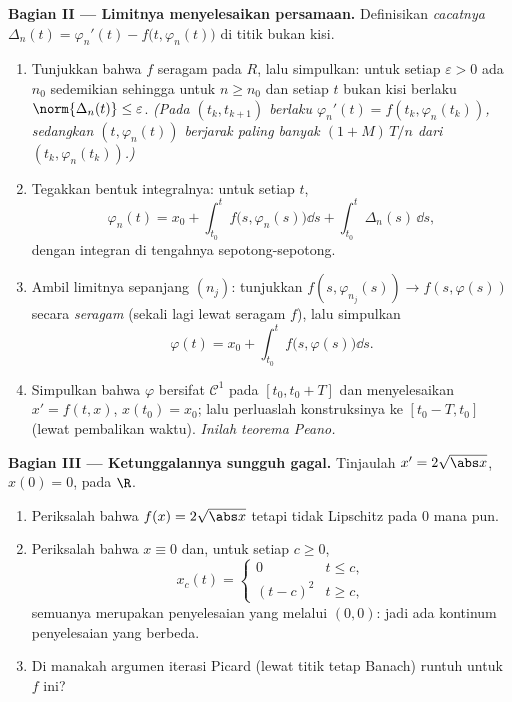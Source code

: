 \begin{problem}[{Soal akhir pekan --- keberadaan penyelesaian
$x' = f(t, x)$ tanpa Lipschitz}]
\medskip
\noindent\textbf{Bagian II --- Limitnya menyelesaikan persamaan.}
Definisikan \emph{cacatnya} $\Delta_n(t) = \varphi_n'(t) -
f\bigl(t, \varphi_n(t)\bigr)$ di titik bukan kisi.
\begin{enumerate}[resume]
  \item Tunjukkan bahwa $f$  seragam pada $R$, lalu
        simpulkan: untuk setiap $\varepsilon > 0$ ada $n_0$ sedemikian
        sehingga untuk $n \geq n_0$ dan setiap $t$ bukan kisi berlaku
        $\norm{\Delta_n(t)} \leq \varepsilon$. \emph{(Pada $(t_k,
        t_{k+1})$ berlaku $\varphi_n'(t) = f(t_k, \varphi_n(t_k))$,
        sedangkan $(t, \varphi_n(t))$ berjarak paling banyak
        $(1 + M)\,T/n$ dari $(t_k, \varphi_n(t_k))$.)}
  \item Tegakkan bentuk integralnya: untuk setiap $t$,
        \[
        \varphi_n(t) = x_0 + \int_{t_0}^{t}
        f\bigl(s, \varphi_n(s)\bigr)\dd s +
        \int_{t_0}^t \Delta_n(s)\,\dd s,
        \]
        dengan integran di tengahnya  sepotong-sepotong.
  \item Ambil limitnya sepanjang $(n_j)$: tunjukkan
        $f(s, \varphi_{n_j}(s)) \to f(s, \varphi(s))$
        secara \emph{seragam} (sekali lagi lewat  seragam $f$), lalu
        simpulkan
        \[
        \varphi(t) = x_0 + \int_{t_0}^t
        f\bigl(s, \varphi(s)\bigr)\dd s .
        \]
  \item Simpulkan bahwa $\varphi$ bersifat $\mathcal C^1$ pada $[t_0, t_0 +
        T]$ dan menyelesaikan $x' = f(t, x)$, $x(t_0) = x_0$; lalu perluaslah
        konstruksinya ke $[t_0 - T, t_0]$ (lewat pembalikan waktu).
        \emph{Inilah teorema Peano.}
\end{enumerate}

\medskip
\noindent\textbf{Bagian III --- Ketunggalannya sungguh gagal.}
Tinjaulah $x' = 2\sqrt{\abs x}$, $x(0) = 0$, pada $\R$.
\begin{enumerate}[resume]
  \item Periksalah bahwa $f(x) = 2\sqrt{\abs x}$  tetapi
        tidak Lipschitz pada  $0$ mana pun.
  \item Periksalah bahwa $x \equiv 0$ dan, untuk setiap $c \geq 0$,
        \[
        x_c(t) = \begin{cases} 0 & t \leq c,\\ (t - c)^2 & t
        \geq c,\end{cases}
        \]
        semuanya merupakan penyelesaian yang melalui $(0,0)$: jadi ada kontinum
        penyelesaian yang berbeda.
  \item Di manakah argumen iterasi Picard (lewat titik tetap
        Banach) runtuh untuk $f$ ini?
\end{enumerate}


\end{problem}
